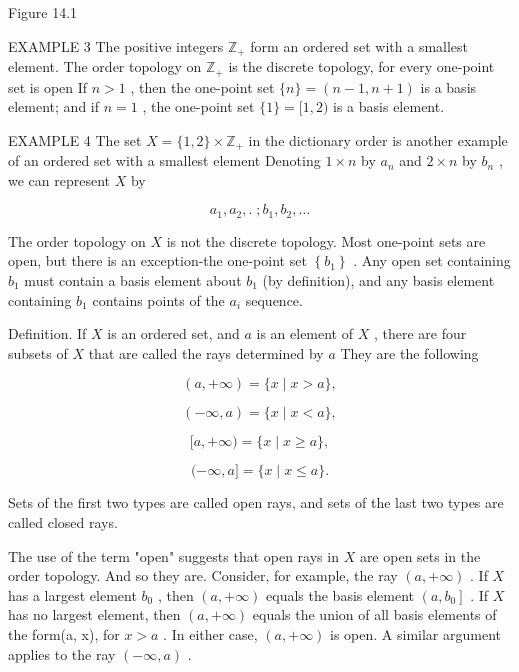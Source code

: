 Figure 14.1

EXAMPLE 3 The positive integers \({\mathbb{Z}}_{ + }\) form an ordered set with a smallest element. The order topology on \({\mathbb{Z}}_{ + }\) is the discrete topology, for every one-point set is open If \(n > 1\) , then the one-point set \(\{ n\}  = \left( {n - 1,n + 1}\right)\) is a basis element; and if \(n = 1\) , the one-point set \(\{ 1\}  = \lbrack 1,2)\) is a basis element.

EXAMPLE 4 The set \(X = \{ 1,2\}  \times  {\mathbb{Z}}_{ + }\) in the dictionary order is another example of an ordered set with a smallest element Denoting \(1 \times  n\) by \({a}_{n}\) and \(2 \times  n\) by \({b}_{n}\) , we can represent \(X\) by

\[
{a}_{1},{a}_{2},.\;;{b}_{1},{b}_{2},\ldots
\]

The order topology on \(X\) is not the discrete topology. Most one-point sets are open, but there is an exception-the one-point set \(\left\{  {b}_{1}\right\}\) . Any open set containing \({b}_{1}\) must contain a basis element about \({b}_{1}\) (by definition), and any basis element containing \({b}_{1}\) contains points of the \({a}_{i}\) sequence.

Definition. If \(X\) is an ordered set, and \(a\) is an element of \(X\) , there are four subsets of \(X\) that are called the rays determined by \(a\) They are the following

\[
\left( {a, + \infty }\right)  = \{ x \mid  x > a\} ,
\]

\[
\left( {-\infty ,a}\right)  = \{ x \mid  x < a\} ,
\]

\[
\lbrack a, + \infty ) = \{ x \mid  x \geq  a\} ,
\]

\[
( - \infty ,a\rbrack  = \{ x \mid  x \leq  a\} .
\]

Sets of the first two types are called open rays, and sets of the last two types are called closed rays.

The use of the term "open" suggests that open rays in \(X\) are open sets in the order topology. And so they are. Consider, for example, the ray \(\left( {a, + \infty }\right)\) . If \(X\) has a largest element \({b}_{0}\) , then \(\left( {a, + \infty }\right)\) equals the basis element \(\left( {a,{b}_{0}}\right\rbrack\) . If \(X\) has no largest element, then \(\left( {a, + \infty }\right)\) equals the union of all basis elements of the form(a, x), for \(x > a\) . In either case, \(\left( {a, + \infty }\right)\) is open. A similar argument applies to the ray \(\left( {-\infty ,a}\right)\) .

